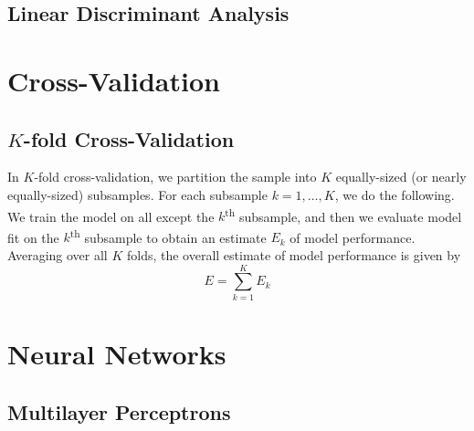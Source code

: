 \documentclass[11pt]{report} %
\begin{document}
\subsection{Linear Discriminant Analysis}

\section{Cross-Validation}

\subsection{$K$-fold Cross-Validation}

In $K$-fold cross-validation, we partition the sample into $K$ equally-sized (or nearly equally-sized) subsamples. For each subsample $k = 1, \dots, K$, we do the following. We train the model on all except the $k$\textsuperscript{th} subsample, and then we evaluate model fit on the $k$\textsuperscript{th} subsample to obtain an estimate $E_{k}$ of model performance. Averaging over all $K$ folds, the overall estimate of model performance is given by
\begin{equation}
E = \sum_{k = 1}^{K}E_{k}
\end{equation}

\section{Neural Networks}

\subsection{Multilayer Perceptrons}
\end{document}
